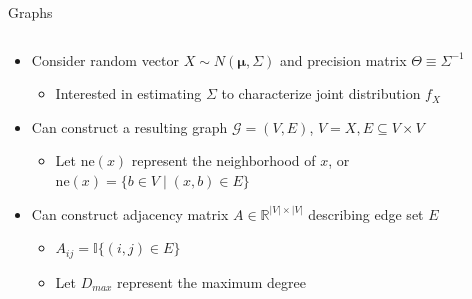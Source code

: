 \documentclass{beamer}
\newcommand{\nhood}{\text{ne}}
\begin{document}
\begin{frame}{Graphs}
    \begin{columns}[T] %
        \begin{column}{.7\textwidth}
            \begin{itemize}%
                \setlength\itemsep{5mm}
                \item Consider random vector $X \sim N(\boldsymbol\mu, \Sigma)$ and precision matrix $\Theta \equiv \Sigma^{-1}$
                \begin{itemize} 
                    \item Interested in estimating $\Sigma$ to characterize joint distribution $f_X$
                \end{itemize}
                \item Can construct a resulting graph $\mathcal{G} = (V, E)$, $V = X, E \subseteq V \times V$
                \begin{itemize} \item Let $\nhood(x)$ represent the neighborhood of $x$, or $\nhood(x) = \{b \in V \mid (x,b) \in E\}$ \end{itemize}
                \item Can construct adjacency matrix $A \in \mathbb{R}^{|V| \times |V|}$ describing edge set $E$ 
                    \begin{itemize} 
                        \item $A_{ij}=\mathbb{I}\{(i,j) \in E\}$ 
                        \item Let $D_{max}$ represent the maximum degree
                    \end{itemize} 
                \end{itemize}
        \end{column}
        \begin{column}{.3\textwidth}
                \centering
\end{column}
\end{columns}
\end{frame}
\end{document}
